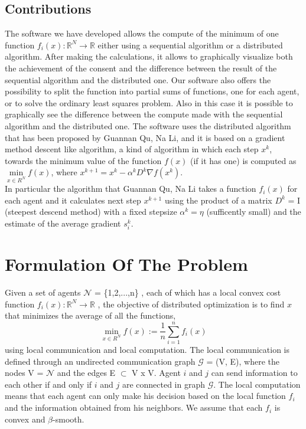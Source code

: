 \documentclass[a4paper,11pt,oneside]{book}
\begin{document}
\section*{Contributions}
The software we have developed allows the compute of the minimum of one function $f_i(x): \mathbb{R}^{N} \rightarrow \mathbb{R}$ either using a sequential algorithm or a distributed algorithm. After making the calculations, it allows to graphically visualize both the achievement of the consent and the difference between the result of the sequential algorithm and the distributed one. 
Our software also offers the possibility to split the function into partial sums of functions, one for each agent, or to solve the ordinary least squares problem. Also in this case it is possible to graphically see the difference between the compute made with the sequential algorithm and the distributed one.
The software uses the distributed algorithm that has been proposed by Guannan Qu, Na Li, and it is based on a gradient method descent like algorithm, a kind of algorithm in which each step $x^{k}$, towards the minimum value of the function $f(x)$ (if it has one) is computed as $\min\limits_{x \in R^{N}} f(x)$, where $x^{k+1}= x^{k}- \alpha^{k} D^{k}\nabla f(x^{k})$.
\\In particular the algorithm that Guannan Qu, Na Li takes a function $f_{i}(x)$ for each agent and it calculates next step $x^{k+1}$ using the product of a matrix $D^{k}$ = I  (steepest descend method) with a fixed stepsize $\alpha^{k}= \eta$ (sufficently small) and the estimate of the average gradient $s_{i}^{k}$.


\chapter{Formulation Of The Problem}
Given a set of agents $\mathcal{N}$ = \{1,2,...,n\} , each of which has
a local convex cost function $f_i(x): \mathbb{R}^{N} \rightarrow \mathbb{R}$ , the objective of
distributed optimization is to find $x$ that minimizes the average of all the functions,
\begin{equation}
\min\limits_{x \in R^{N}} f(x) := \dfrac{1}{n} \sum\limits_{i=1}^{n} f_i (x)
\end{equation}
using local communication and local computation. The local communication is defined through an undirected communication graph $\mathcal{G}$ = (V, E), where the nodes V = $\mathcal{N}$ and the edges E $\subset$ V x V.
Agent $i$ and $j$ can send information to
each other if and only if $i$ and $j$ are connected in graph $\mathcal{G}$.
The local computation means that each agent can only make
his decision based on the local function $f_{i}$ and the information
obtained from his neighbors.
We assume that each $f_{i}$ is convex and $\beta$-smooth.
\end{document}
